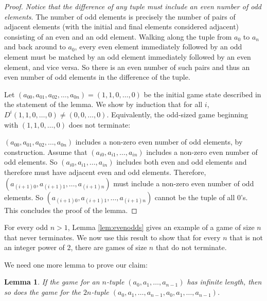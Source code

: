 \documentclass[12pt]{amsart}
\newtheorem{lemma}[theorem]{Lemma}
\begin{document}
\begin{proof}
\emph{Notice that the difference of any tuple must include an even number of odd elements}. The number of odd elements is precisely the number of pairs of adjacent elements (with the initial and final elements considered adjacent) consisting of an even and an odd element. Walking along the tuple from $a_0$ to $a_n$ and back around to $a_0$, every even element immediately followed by an odd element must be matched by an odd element immediately followed by an even element, and vice versa. So there is an even number of such pairs and thus an even number of odd elements in the difference of the tuple.

Let $(a_{00}, a_{01}, a_{02}, \ldots, a_{0n}) = (1, 1, 0, \ldots, 0)$ be the initial game state described in the statement of the lemma. We show by induction that for all $i$, 
$D^i(1,1,0,\ldots,0) \neq (0, 0, \ldots, 0)$. Equivalently, the odd-sized game beginning with $(1, 1, 0, \ldots, 0)$ does not terminate:

$(a_{00}, a_{01}, a_{02}, \ldots, a_{0n})$ includes a non-zero even number of odd elements, by construction. Assume that $(a_{i0}, a_{i1}, \ldots, a_{in})$ includes a non-zero even number of odd elements. So $(a_{i0}, a_{i1}, \ldots, a_{in})$ includes both even and odd elements and therefore must have adjacent even and odd elements. Therefore, $(a_{(i+1)0}, a_{(i+1)1}, \ldots, a_{(i+1)n})$ must include a non-zero even number of odd elements. So  $(a_{(i+1)0}, a_{(i+1)1}, \ldots, a_{(i+1)n})$ cannot be the tuple of all $0$'s. This concludes the proof of the lemma.
\end{proof}

For every odd $n > 1$, Lemma \ref{lem:evenodds} gives an example of a game of size $n$ that never terminates. We now use this result to show that for every $n$ that is not an integer power of 2, there are games of size $n$ that do not terminate.

We need one more lemma to prove our claim:

\begin{lemma}
\label{lem:doubles}
If the game for an $n$-tuple $(a_0, a_1, \ldots, a_{n-1})$ has infinite length, then so does the game for the $2n$-tuple $(a_0, a_1, \ldots, a_{n-1}, a_0, a_1, \ldots, a_{n-1})$.
\end{lemma}
\end{document}
